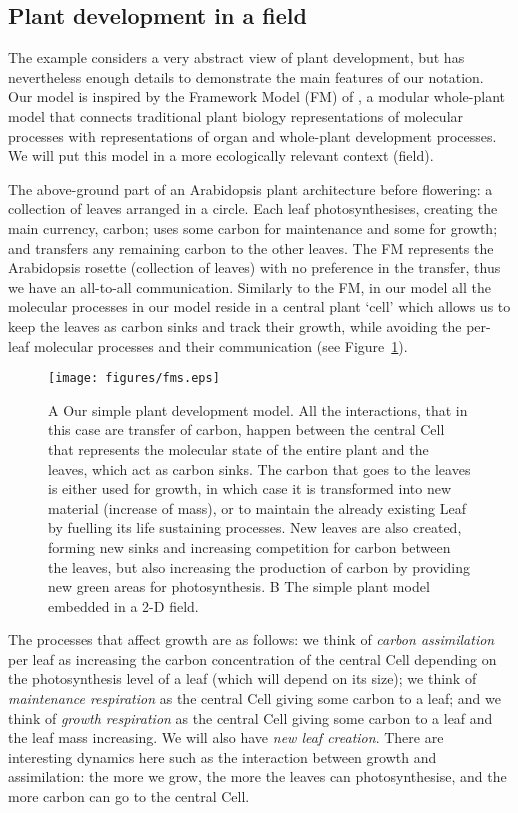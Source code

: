 \subsection{Plant development in a field}
\label{subsec:plantDev}
The example considers a very abstract view of plant development, but has
nevertheless enough details to demonstrate the main features of our
notation. Our model is inspired by the Framework Model (FM) of
\citet{chew_multiscale_2014}, a modular whole-plant model that connects
traditional plant biology representations of molecular processes with
representations of organ and whole-plant development processes. We will put this
model in a more ecologically relevant context (field).

The above-ground part of an Arabidopsis plant
architecture before flowering: a collection of leaves arranged in a circle. Each
leaf photosynthesises, creating the main currency, carbon; uses some carbon for
maintenance and some for growth; and transfers any remaining carbon to the other
leaves. The FM represents the Arabidopsis rosette (collection of leaves) with no
preference in the transfer, thus we have an all-to-all communication. Similarly
to the FM, in our model all the molecular processes in our model reside in a
central plant `cell' which allows us to keep the leaves as carbon sinks and
track their growth, while avoiding the per-leaf molecular processes and their
communication (see Figure~\ref{fig:fm}).

\begin{figure}
\centering
\texttt{[image: figures/fms.eps]}
\caption{ A Our simple plant development model. All the interactions, that in
  this case are transfer of carbon, happen between the central Cell that
  represents the molecular state of the entire plant and the leaves, which act
  as carbon sinks. The carbon that goes to the leaves is either used for growth,
  in which case it is transformed into new material (increase of mass), or to
  maintain the already existing Leaf by fuelling its life sustaining
  processes. New leaves are also created, forming new sinks and increasing
  competition for carbon between the leaves, but also increasing the production
  of carbon by providing new green areas for photosynthesis. B The simple plant
  model embedded in a 2-D field.}
\label{fig:fm}
\end{figure}

The processes that affect growth are as follows: we think of \textit{carbon
assimilation} per leaf as increasing the carbon concentration of the central
Cell depending on the photosynthesis level of a leaf (which will depend on its
size); we think of \textit{maintenance respiration} as the central Cell giving
some carbon to a leaf; and we think of \textit{growth respiration} as the
central Cell giving some carbon to a leaf and the leaf mass increasing. We will
also have \textit{new leaf creation}. There are interesting dynamics here such
as the interaction between growth and assimilation: the more we grow, the more
the leaves can photosynthesise, and the more carbon can go to the central Cell.


